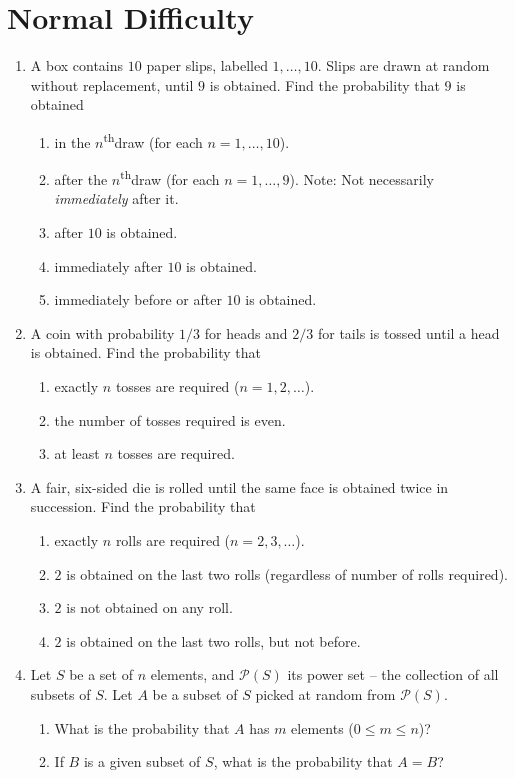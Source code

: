 \documentclass[svgnames]{amsart}
\renewcommand{\th}{\textsuperscript{th}}
\begin{document}
\section{Normal Difficulty}
\begin{enumerate}
\item A box contains $10$ paper slips, labelled $1, \ldots, 10$. Slips are drawn at random without replacement, until $9$ is obtained. Find the probability that $9$ is obtained
\begin{enumerate}
	\item in the $n$\th draw (for each $n = 1, \ldots, 10$).
	\item after the $n$\th draw (for each $n = 1, \ldots, 9$). {\scriptsize Note: Not necessarily \emph{immediately} after it.}
	\item after $10$ is obtained.
	\item immediately after $10$ is obtained.
	\item immediately before or after $10$ is obtained.
\end{enumerate}

\item A coin with probability $1/3$ for heads and $2/3$ for tails is tossed until a head is obtained. Find the probability that
\begin{enumerate}
	\item exactly $n$ tosses are required ($n = 1, 2, \ldots$).
	\item the number of tosses required is even.
	\item at least $n$ tosses are required.
\end{enumerate}

\item A fair, six-sided die is rolled until the same face is obtained twice in succession. Find the probability that
\begin{enumerate}
	\item exactly $n$ rolls are required ($n = 2, 3, \ldots$).
	\item $2$ is obtained on the last two rolls (regardless of number of rolls required).
	\item $2$ is not obtained on any roll.
	\item $2$ is obtained on the last two rolls, but not before.
\end{enumerate}

\item Let $S$ be a set of $n$ elements, and $\mathcal P(S)$ its power set -- the collection of all subsets of $S$. Let $A$ be a subset of $S$ picked at random from $\mathcal P(S)$.
\begin{enumerate}
	\item What is the probability that $A$ has $m$ elements ($0 \le m \le n$)?
	\item If $B$ is a given subset of $S$, what is the probability that $A = B$?
\end{enumerate}


\end{enumerate}
\end{document}
